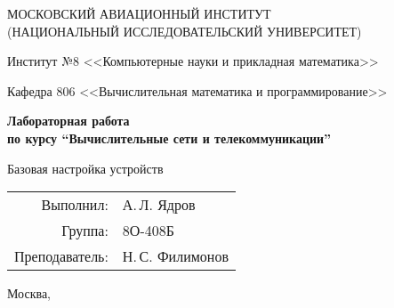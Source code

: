 \begin{titlepage}
\begin{center}
\large
МОСКОВСКИЙ АВИАЦИОННЫЙ ИНСТИТУТ\\ (НАЦИОНАЛЬНЫЙ ИССЛЕДОВАТЕЛЬСКИЙ УНИВЕРСИТЕТ)

\vspace{20pt}

Институт №8 <<Компьютерные науки и прикладная математика>>

Кафедра 806 <<Вычислительная математика и программирование>>
\end{center}

\vspace{60pt}

\begin{center}
\bfseries
\large
Лабораторная работа  \\по курсу \enquote{Вычислительные сети и телекоммуникации}

\vspace{54pt}

Базовая настройка устройств
\end{center}

\vfill

\begin{flushright}
\large
\begin{tabular}{rl}
Выполнил: & А.\,Л. Ядров \\
Группа: & 8О-408Б \\
Преподаватель: & Н.\,С. Филимонов \\
\end{tabular}
\end{flushright}

\vspace{92pt}

\begin{center}
\large
Москва, \the\year
\end{center}
\end{titlepage}

\pagebreak
